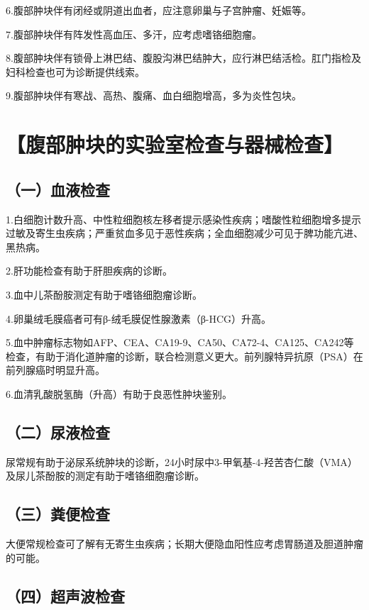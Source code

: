 6.腹部肿块伴有闭经或阴道出血者，应注意卵巢与子宫肿瘤、妊娠等。

7.腹部肿块伴有阵发性高血压、多汗，应考虑嗜铬细胞瘤。

8.腹部肿块伴有锁骨上淋巴结、腹股沟淋巴结肿大，应行淋巴结活检。肛门指检及妇科检查也可为诊断提供线索。

9.腹部肿块伴有寒战、高热、腹痛、血白细胞增高，多为炎性包块。

\section{【腹部肿块的实验室检查与器械检查】}

\subsection{（一）血液检查}

1.白细胞计数升高、中性粒细胞核左移者提示感染性疾病；嗜酸性粒细胞增多提示过敏及寄生虫疾病；严重贫血多见于恶性疾病；全血细胞减少可见于脾功能亢进、黑热病。

2.肝功能检查有助于肝胆疾病的诊断。

3.血中儿茶酚胺测定有助于嗜铬细胞瘤诊断。

4.卵巢绒毛膜癌者可有β-绒毛膜促性腺激素（β-HCG）升高。

5.血中肿瘤标志物如AFP、CEA、CA19-9、CA50、CA72-4、CA125、CA242等检查，有助于消化道肿瘤的诊断，联合检测意义更大。前列腺特异抗原（PSA）在前列腺癌时明显升高。

6.血清乳酸脱氢酶（升高）有助于良恶性肿块鉴别。

\subsection{（二）尿液检查}

尿常规有助于泌尿系统肿块的诊断，24小时尿中3-甲氧基-4-羟苦杏仁酸（VMA）及尿儿茶酚胺的测定有助于嗜铬细胞瘤诊断。

\subsection{（三）粪便检查}

大便常规检查可了解有无寄生虫疾病；长期大便隐血阳性应考虑胃肠道及胆道肿瘤的可能。

\subsection{（四）超声波检查}

